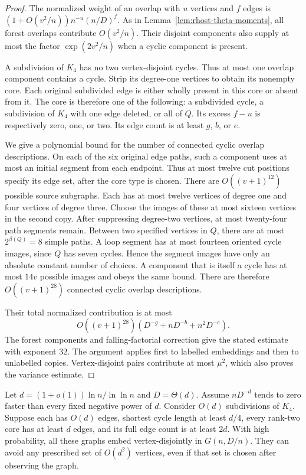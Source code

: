 \begin{proof}
The normalized weight of an overlap with $u$ vertices and $f$ edges is
$(1+O(v^2/n))n^{-u}(n/D)^f$.
As in Lemma~\ref{lem:rhost-theta-moments}, all forest overlaps contribute $O(v^2/n)$.
Their disjoint components also supply at most the factor $\exp(2v^2/n)$ when a cyclic component is present.

A subdivision of $K_4$ has no two vertex-disjoint cycles.
Thus at most one overlap component contains a cycle.
Strip its degree-one vertices to obtain its nonempty core.
Each original subdivided edge is either wholly present in this core or absent from it.
The core is therefore one of the following:
a subdivided cycle, a subdivision of $K_4$ with one edge deleted, or all of $Q$.
Its excess $f-u$ is respectively zero, one, or two.
Its edge count is at least $g$, $b$, or $e$.

We give a polynomial bound for the number of connected cyclic overlap descriptions.
On each of the six original edge paths, such a component uses at most an initial segment from each endpoint.
Thus at most twelve cut positions specify its edge set, after the core type is chosen.
There are $O((v+1)^{12})$ possible source subgraphs.
Each has at most twelve vertices of degree one and four vertices of degree three.
Choose the images of these at most sixteen vertices in the second copy.
After suppressing degree-two vertices, at most twenty-four path segments remain.
Between two specified vertices in $Q$, there are at most $2^{\beta(Q)}=8$ simple paths.
A loop segment has at most fourteen oriented cycle images, since $Q$ has seven cycles.
Hence the segment images have only an absolute constant number of choices.
A component that is itself a cycle has at most $14v$ possible images and obeys the same bound.
There are therefore $O((v+1)^{28})$ connected cyclic overlap descriptions.

Their total normalized contribution is at most
\[
 O((v+1)^{28})\left(D^{-g}+nD^{-b}+n^2D^{-e}\right).
\]
The forest components and falling-factorial correction give the stated estimate with exponent $32$.
The argument applies first to labelled embeddings and then to unlabelled copies.
Vertex-disjoint pairs contribute at most $\mu^2$, which also proves the variance estimate.
\end{proof}

\begin{corollary}
\label{cor:rhost-k4-list}
Let $d=(1+o(1))\ln n/\ln\ln n$ and $D=\Theta(d)$.
Assume $nD^{-d}$ tends to zero faster than every fixed negative power of $d$.
Consider $O(d)$ subdivisions of $K_4$.
Suppose each has $O(d)$ edges, shortest cycle length at least $d/4$,
every rank-two core has at least $d$ edges, and its full edge count is at least $2d$.
With high probability, all these graphs embed vertex-disjointly in $G(n,D/n)$.
They can avoid any prescribed set of $O(d^2)$ vertices, even if that set is chosen after observing the graph.
\end{corollary}

